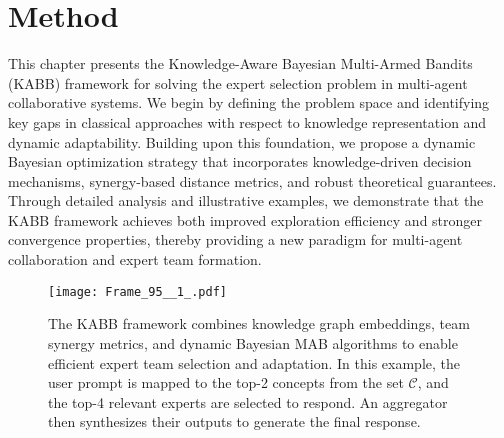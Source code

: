 \section{Method}
\label{sec:method}
This chapter presents the Knowledge-Aware Bayesian Multi-Armed Bandits (KABB) framework for solving the expert selection problem in multi-agent collaborative systems. We begin by defining the problem space and identifying key gaps in classical approaches with respect to knowledge representation and dynamic adaptability. Building upon this foundation, we propose a dynamic Bayesian optimization strategy that incorporates knowledge-driven decision mechanisms, synergy-based distance metrics, and robust theoretical guarantees. Through detailed analysis and illustrative examples, we demonstrate that the KABB framework achieves both improved exploration efficiency and stronger convergence properties, thereby providing a new paradigm for multi-agent collaboration and expert team formation.



\begin{figure*}[t]
    \centering
    \texttt{[image: Frame\_95\_\_1\_.pdf]}
    \caption{The KABB framework combines knowledge graph embeddings, team synergy metrics, and dynamic Bayesian MAB algorithms to enable efficient expert team selection and adaptation. In this example, the user prompt is mapped to the top-2 concepts from the set $\mathcal{C}$, and the top-4 relevant experts are selected to respond. An aggregator then synthesizes their outputs to generate the final response.}
    \label{fig:kabb-framework}
\end{figure*}

